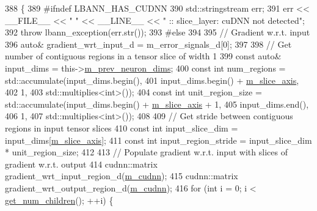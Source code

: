 \begin{DoxyCode}
388                         \{
389 \textcolor{preprocessor}{  #ifndef LBANN\_HAS\_CUDNN}
390     std::stringstream err;
391     err << \_\_FILE\_\_ << \textcolor{stringliteral}{" "} << \_\_LINE\_\_ << \textcolor{stringliteral}{" :: slice\_layer: cuDNN not detected"};
392     \textcolor{keywordflow}{throw} lbann\_exception(err.str());
393 \textcolor{preprocessor}{  #else}
394 
395     \textcolor{comment}{// Gradient w.r.t. input}
396     \textcolor{keyword}{auto}& gradient\_wrt\_input\_d = m\_error\_signals\_d[0];
397 
398     \textcolor{comment}{// Get number of contiguous regions in a tensor slice of width 1}
399     \textcolor{keyword}{const} \textcolor{keyword}{auto}& input\_dims = this->\hyperlink{classlbann_1_1Layer_ae204d1a2a79606eaa117273857ff62a3}{m\_prev\_neuron\_dims};
400     \textcolor{keyword}{const} \textcolor{keywordtype}{int} num\_regions = std::accumulate(input\_dims.begin(),
401                                             input\_dims.begin() + \hyperlink{classlbann_1_1slice__layer_a349dcd71f67d77d40247da24e4641ea2}{m\_slice\_axis},
402                                             1,
403                                             std::multiplies<int>());
404     \textcolor{keyword}{const} \textcolor{keywordtype}{int} unit\_region\_size = std::accumulate(input\_dims.begin() + 
      \hyperlink{classlbann_1_1slice__layer_a349dcd71f67d77d40247da24e4641ea2}{m\_slice\_axis} + 1,
405                                                  input\_dims.end(),
406                                                  1,
407                                                  std::multiplies<int>());
408 
409     \textcolor{comment}{// Get stride between contiguous regions in input tensor slices}
410     \textcolor{keyword}{const} \textcolor{keywordtype}{int} input\_slice\_dim = input\_dims[\hyperlink{classlbann_1_1slice__layer_a349dcd71f67d77d40247da24e4641ea2}{m\_slice\_axis}];
411     \textcolor{keyword}{const} \textcolor{keywordtype}{int} input\_region\_stride = input\_slice\_dim * unit\_region\_size;
412     
413     \textcolor{comment}{// Populate gradient w.r.t. input with slices of gradient w.r.t. output}
414     cudnn::matrix gradient\_wrt\_input\_region\_d(\hyperlink{classlbann_1_1Layer_a08dbb94239e3b8c96329786c57c72e21}{m\_cudnn});
415     cudnn::matrix gradient\_wrt\_output\_region\_d(\hyperlink{classlbann_1_1Layer_a08dbb94239e3b8c96329786c57c72e21}{m\_cudnn});
416     \textcolor{keywordflow}{for} (\textcolor{keywordtype}{int} i = 0; i < \hyperlink{classlbann_1_1Layer_a1409a117c31a7ea4f2c7a4d22a3e86c3}{get\_num\_children}(); ++i) \{

\end{DoxyCode}
